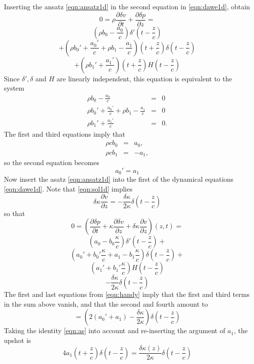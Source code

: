 Inserting the ansatz \ref{eqn:ansatz1d} in the second equation in \ref{eqn:dawe1d}, obtain
\[
0=\rho \frac{\partial \delta v}{\partial t} + \frac{\partial \delta p}{\partial
  z} = 
\]
\[
\left(\rho b_0 - \frac{a_0}{c}\right) \delta'\left(t -
  \frac{z}{c}\right)
\]
\[
+\left(\rho b_0' + \frac{a_0'}{c}+\rho b_1 - \frac{a_1}{c} \right)\left(t + \frac{z}{c}\right) \delta\left(t -
  \frac{z}{c}\right)
\]
\[
 + \left(\rho b_1' + \frac{a_1'}{c}\right) \left(t + \frac{z}{c}\right) H\left(t -
  \frac{z}{c}\right)
\]
Since $\delta', \delta$ and $H$ are linearly independent, this equation is
equivalent to the system
\begin{eqnarray}
\label{eqn:asnbs}
\rho b_0 - \frac{a_0}{c} &=& 0\nonumber\\
\rho b_0' + \frac{a_0'}{c}+\rho b_1 - \frac{a_1}{c} &=&0 \nonumber\\
\rho b_1' + \frac{a_1'}{c} &=&0.
\end{eqnarray}
The first and third equations imply that 
\begin{eqnarray}
\label{eqn:handy}
\rho c b_0&=&a_0,\nonumber\\
\rho c b_1&=&-a_1,
\end{eqnarray}
 so the second equation becomes
\begin{equation}
\label{eqn:as}
a_0' = a_1
\end{equation}
Now insert the asatz \ref{eqn:ansatz1d} into the first of the
dynamical equations \ref{eqn:dawe1d}. Note that \ref{eqn:sol1d}
implies
\[
\delta \kappa \frac{\partial v}{\partial z} = - \frac{\delta
  \kappa}{2\kappa}\delta\left(t - \frac{z}{c}\right)
\]
so that
\[
0 = \left(\frac{\partial \delta p}{\partial t} +\kappa\frac{\partial
  \delta v}{\partial z} + \delta \kappa\frac{\partial
  v}{\partial z}\right)(z,t)=
\]
\[
\left(a_0 - b_0\frac{\kappa}{c}\right)\delta'\left(t - \frac{z}{c}\right) +
\]
\[
\left(a_0' + b_0'\frac{\kappa}{c} + a_1-b_1\frac{\kappa}{c}\right)\delta\left(t -
  \frac{z}{c}\right)+
\]
\[
\left(a_1' + b_1'\frac{\kappa}{c}\right) H\left(t - \frac{z}{c}\right)
\]
\[
- \frac{\delta \kappa}{2\kappa}\delta\left(t - \frac{z}{c}\right)
\]
The first and last equations from \ref{eqn:handy} imply that the first
and third terms in the sum above vanish, and that the second and fourth
amount to
\[
=\left(2 (a_0'+a_1) -\frac{\delta \kappa}{2\kappa}\right) \delta\left(t -
  \frac{z}{c}\right)
\]
Taking the identity \ref{eqn:as} into account and re-inserting the
argument of $a_1$, the upshot is
\[
4a_1\left(t + \frac{z}{c}\right) \delta\left(t -
  \frac{z}{c}\right) = \frac{\delta \kappa(z)}{2\kappa} \delta\left(t
  -  \frac{z}{c}\right)
\]
